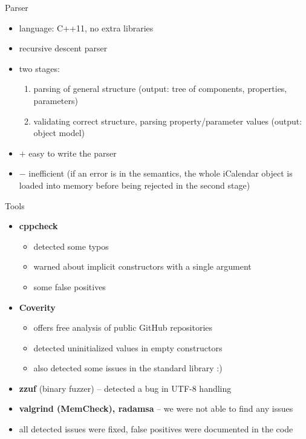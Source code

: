 \documentclass[12pt, t]{beamer}
\begin{document}
\begin{frame}{Parser}
\begin{itemize}
\item language: C++11, no extra libraries
\item recursive descent parser
\item two stages:
	\begin{enumerate}
	\item parsing of general structure (output: tree of components, properties, parameters)
	\item validating correct structure, parsing property/parameter values (output: object model)
	\end{enumerate}
\item $+$ easy to write the parser
\item $-$ inefficient (if an error is in the semantics, the whole iCalendar object is loaded into memory before being rejected in the second stage)
\end{itemize}
\end{frame}

\begin{frame}{Tools}
\begin{itemize}
\item \textbf{cppcheck}
	\begin{itemize}
	\item detected some typos
	\item warned about implicit constructors with a single argument
	\item some false positives
	\end{itemize}
\item \textbf{Coverity}
	\begin{itemize}
	\item offers free analysis of public GitHub repositories
	\item detected uninitialized values in empty constructors
	\item also detected some issues in the standard library :)
	\end{itemize}
\item \textbf{zzuf} (binary fuzzer) -- detected a bug in UTF-8 handling
\item \textbf{valgrind (MemCheck), radamsa} -- we were not able to find any issues
\item all detected issues were fixed, false positives were documented in the code
\end{itemize}
\end{frame}
\end{document}
